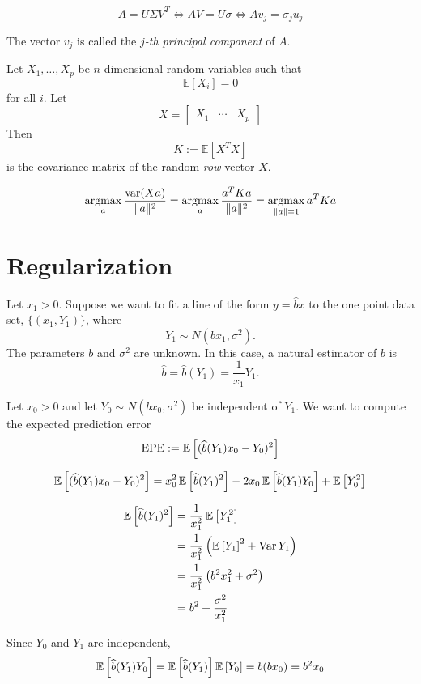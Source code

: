 \documentclass[12pt]{amsart}
\newcommand{\E}[1]{\mathbb{E}\left[#1\right]}
\begin{document}
\[A = U\Sigma V^T\Longleftrightarrow AV = U\sigma
\Longleftrightarrow Av_j = \sigma_j u_j\]

\begin{definition}
    The vector $v_j$ is called the \emph{$j$-th principal component} of $A$.
\end{definition}

Let $X_1,\ldots,X_p$ be $n$-dimensional random variables such that
\[
    \E{X_i}=0
\]
for all $i$. Let
\[
    X = \begin{bmatrix}
        X_1&\cdots& X_p
    \end{bmatrix}
\]
Then $$K := \E{X^TX}$$ is the covariance matrix of the random \emph{row} vector $X$.

\[
    \operatorname*{argmax}_a\dfrac {\operatorname{var}(Xa)}{\|a\|^2}
    =\operatorname*{argmax}_a\dfrac{a^T K a}{\|a\|^2}
    =\operatorname*{argmax}_{\|a\|=1} a^T K a
\]




\section{Regularization}

Let $x_1>0$.
Suppose we want to fit a line of the form $y=\hat b x$ to the one point data set,
$\{(x_1, Y_1)\}$, where
\[
    Y_1\sim N(bx_1,\sigma^2).
\]
The parameters $b$ and $\sigma^2$ are unknown.
In this case, a natural estimator of $b$ is
\[
    \hat b = \hat b(Y_1) = \frac1{x_1}Y_1.
\]

Let $x_0>0$ and let $Y_0\sim N(bx_0, \sigma^2)$ be independent of $Y_1$.
We want to compute the expected prediction error
\[
    \operatorname{EPE} := \operatorname{\mathbb{E}}\left[(\widehat b(Y_1) x_0 - Y_0)^2\right]
\]

\[
    \operatorname{\mathbb{E}}\left[(\widehat b(Y_1) x_0 - Y_0)^2\right] = 
    x_0^2\operatorname{\mathbb{E}}\left[\widehat b(Y_1)^2\right] - 2x_0\operatorname{\mathbb{E}}\left[\widehat b(Y_1)Y_0\right] + \operatorname{\mathbb{E}}\left[Y_0^2\right]
\]

\begin{align*}
    \operatorname{\mathbb{E}}\left[\widehat b(Y_1)^2\right]
    &= \frac1{x_1^2}\operatorname{\mathbb{E}}\left[Y_1^2\right]\\
    &= \frac1{x_1^2}\left(\operatorname{\mathbb{E}}\left[Y_1\right]^2 + \operatorname{Var} Y_1  \right)\\
    &= \frac1{x_1^2}\left(b^2x_1^2 + \sigma^2\right)\\
    &= b^2 + \frac{\sigma^2}{x_1^2}
\end{align*}

Since $Y_0$ and $Y_1$ are independent,
\[
    \operatorname{\mathbb{E}}\left[\widehat b(Y_1)Y_0\right]
    = \operatorname{\mathbb{E}}\left[\widehat b(Y_1)\right]\operatorname{\mathbb{E}}\left[Y_0\right] = b(bx_0) = b^2x_0
\]
\end{document}
